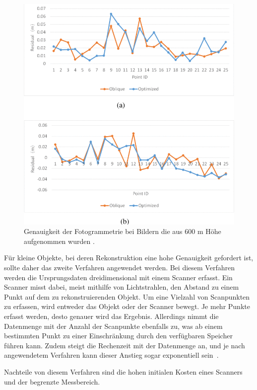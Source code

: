\begin{figure}[H]
    \centering
    \includegraphics[width=\linewidth]{images/photogammatry_accurancy.PNG}
    \caption{Genauigkeit der Fotogrammetrie bei Bildern die aus 
    600 m Höhe aufgenommen wurden \cite{Elaksher.2023}.}
    \label{fig:photogammatryAccuracy}
\end{figure}

Für kleine Objekte, bei deren Rekonstruktion eine hohe Genauigkeit gefordert ist, 
sollte daher das zweite Verfahren angewendet werden. Bei diesem Verfahren werden
die Ursprungsdaten dreidimensional mit einem Scanner erfasst. Ein Scanner misst dabei, 
meist mithilfe von Lichtstrahlen, den Abstand zu einem Punkt auf dem zu 
rekonstruierenden Objekt. Um eine Vielzahl von Scanpunkten zu erfassen, 
wird entweder das Objekt oder der Scanner bewegt. Je mehr Punkte erfasst werden, 
desto genauer wird das Ergebnis. Allerdings nimmt die Datenmenge mit der Anzahl der 
Scanpunkte ebenfalls zu, was ab einem bestimmten Punkt zu einer Einschränkung durch den 
verfügbaren Speicher führen kann. Zudem steigt die Rechenzeit mit der Datenmenge an, 
und je nach angewendetem Verfahren kann dieser Anstieg sogar 
exponentiell sein~\cite{XiaoleiDu.2009}.

Nachteile von diesem Verfahren sind die hohen initialen Kosten eines Scanners 
und der begrenzte Messbereich. 

